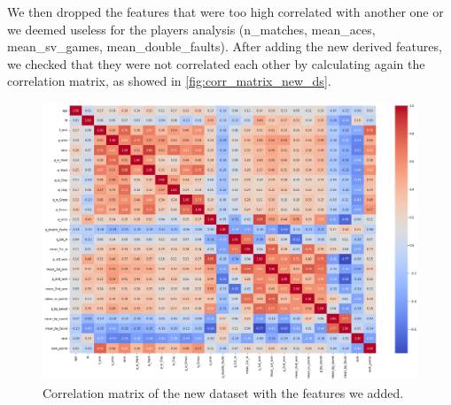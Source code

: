 We then dropped the features that were too high correlated with another one or we deemed useless for the players analysis (n\_matches, mean\_aces, mean\_sv\_games, mean\_double\_faults).
After adding the new derived features, we checked that they were not correlated each other by calculating again the correlation matrix, as showed in \autoref{fig:corr_matrix_new_ds}.

\begin{figure}[H]
    \centering
    \includegraphics[width=0.8\linewidth]{images/data_preparation/players_corr_features.png}
    \caption{Correlation matrix of the new dataset with the features we added.}
    \label{fig:corr_matrix_new_ds}
\end{figure}